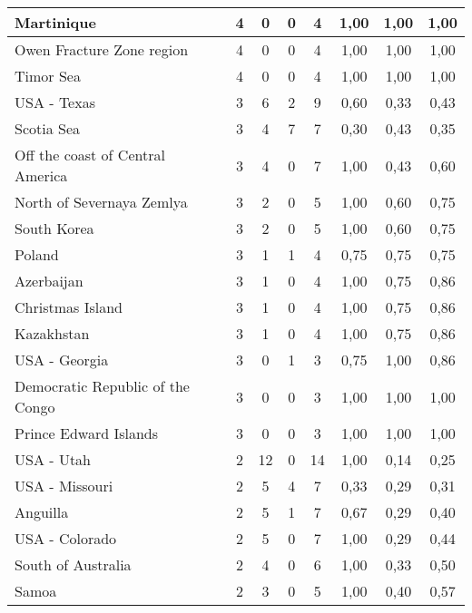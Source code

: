 {\begin{table}[!ht]
\begin{tabular}{|l|ccc|c|ccc|}
Martinique	 & 4 	 & 0   	 & 0   	& 4	 & 1,00 &	1,00 &	1,00 \\ \hline
Owen Fracture Zone region	 & 4 	 & 0   	 & 0   	& 4	 & 1,00 &	1,00 &	1,00 \\ \hline
Timor Sea	 & 4 	 & 0   	 & 0   	& 4	 & 1,00 &	1,00 &	1,00 \\ \hline
USA - Texas	 & 3 	 & 6 	 & 2 	& 9	 & 0,60 &	0,33 &	0,43 \\ \hline
Scotia Sea	 & 3 	 & 4 	 & 7 	& 7	 & 0,30 &	0,43 &	0,35 \\ \hline
Off the coast of Central America	 & 3 	 & 4 	 & 0   	& 7	 & 1,00 &	0,43 &	0,60 \\ \hline
North of Severnaya Zemlya	 & 3 	 & 2 	 & 0   	& 5	 & 1,00 &	0,60 &	0,75 \\ \hline
South Korea	 & 3 	 & 2 	 & 0   	& 5	 & 1,00 &	0,60 &	0,75 \\ \hline
Poland	 & 3 	 & 1 	 & 1 	& 4	 & 0,75 &	0,75 &	0,75 \\ \hline
Azerbaijan	 & 3 	 & 1 	 & 0   	& 4	 & 1,00 &	0,75 &	0,86 \\ \hline
Christmas Island	 & 3 	 & 1 	 & 0   	& 4	 & 1,00 &	0,75 &	0,86 \\ \hline
Kazakhstan	 & 3 	 & 1 	 & 0   	& 4	 & 1,00 &	0,75 &	0,86 \\ \hline
USA - Georgia	 & 3 	 & 0   	 & 1 	& 3	 & 0,75 &	1,00 &	0,86 \\ \hline
Democratic Republic of the Congo	 & 3 	 & 0   	 & 0   	& 3	 & 1,00 &	1,00 &	1,00 \\ \hline
Prince Edward Islands	 & 3 	 & 0   	 & 0   	& 3	 & 1,00 &	1,00 &	1,00 \\ \hline
USA - Utah	 & 2 	 & 12 	 & 0   	& 14	 & 1,00 &	0,14 &	0,25 \\ \hline
USA - Missouri	 & 2 	 & 5 	 & 4 	& 7	 & 0,33 &	0,29 &	0,31 \\ \hline
Anguilla	 & 2 	 & 5 	 & 1 	& 7	 & 0,67 &	0,29 &	0,40 \\ \hline
USA - Colorado	 & 2 	 & 5 	 & 0   	& 7	 & 1,00 &	0,29 &	0,44 \\ \hline
South of Australia	 & 2 	 & 4 	 & 0   	& 6	 & 1,00 &	0,33 &	0,50 \\ \hline
Samoa	 & 2 	 & 3 	 & 0   	& 5	 & 1,00 &	0,40 &	0,57 \\ \hline
   \end{tabular}
\end{table}}

